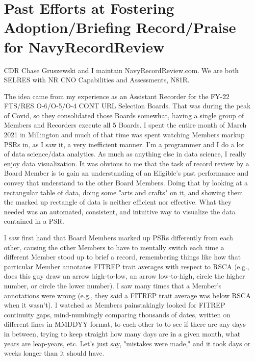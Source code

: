 \documentclass[UTF8]{article}
\begin{document}
\section{Past Efforts at Fostering Adoption/Briefing Record/Praise for NavyRecordReview}



CDR Chase Gruszewski and I maintain NavyRecordReview.com. We are both SELRES with NR CNO Capabilities and Assessments, N81R.

The idea came from my experience as an Assistant Recorder for the FY-22 FTS/RES O-6/O-5/O-4 CONT URL Selection Boards. That was during the peak of Covid, so they consolidated those Boards somewhat, having a single group of Members and Recorders execute all 5 Boards. I spent the entire month of March 2021 in Millington and much of that time was spent watching Members markup PSRs in, as I saw it, a very inefficient manner. I'm a programmer and I do a lot of data science/data analytics. As much as anything else in data science, I really enjoy data visualization. It was obvious to me that the task of record review by a Board Member is to gain an understanding of an Eligible's past performance and convey that understand to the other Board Members. Doing that by looking at a rectangular table of data, doing some "arts and crafts" on it, and showing them the marked up rectangle of data is neither efficient nor effective. What they needed was an automated, consistent, and intuitive way to visualize the data contained in a PSR.

I saw first hand that Board Members marked up PSRs differently from each other, causing the other Members to have to mentally switch each time a different Member stood up to brief a record, remembering things like how that particular Member annotates FITREP trait averages with respect to RSCA (e.g., does this guy draw an arrow high-to-low, an arrow low-to-high, circle the higher number, or circle the lower number). I saw many times that a Member's annotations were wrong (e.g., they said a FITREP trait average was below RSCA when it wasn't). I watched as Members painstakingly looked for FITREP continuity gaps, mind-numbingly comparing thousands of dates, written on different lines in MMDDYY format, to each other to to see if there are any days in between, trying to keep straight how many days are in a given month, what years are leap-years, etc. Let's just say, "mistakes were made," and it took days or weeks longer than it should have.
\end{document}
